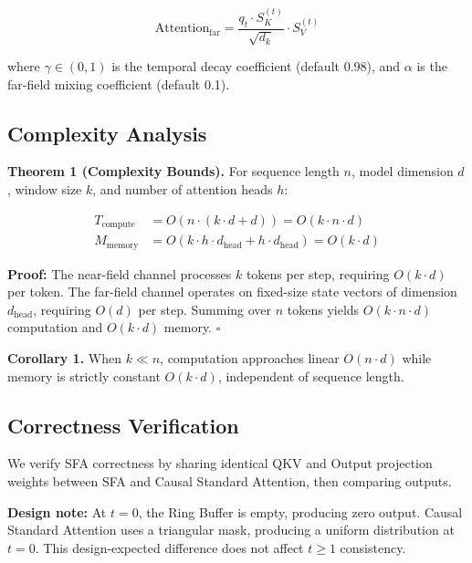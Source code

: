 \documentclass[11pt]{article}
\begin{document}
\begin{equation}
\text{Attention}_{\text{far}} = \frac{q_t \cdot S_K^{(t)}}{\sqrt{d_k}} \cdot S_V^{(t)}
\end{equation}

where $\gamma \in (0,1)$ is the temporal decay coefficient (default 0.98), and $\alpha$ is the far-field mixing coefficient (default 0.1).

\subsection{Complexity Analysis}

\textbf{Theorem 1 (Complexity Bounds).} For sequence length $n$, model dimension $d$, window size $k$, and number of attention heads $h$:

\begin{align}
T_{\text{compute}} &= O(n \cdot (k \cdot d + d)) = O(k \cdot n \cdot d) \\
M_{\text{memory}} &= O(k \cdot h \cdot d_{\text{head}} + h \cdot d_{\text{head}}) = O(k \cdot d)
\end{align}

\noindent\textbf{Proof:} The near-field channel processes $k$ tokens per step, requiring $O(k \cdot d)$ per token. The far-field channel operates on fixed-size state vectors of dimension $d_{\text{head}}$, requiring $O(d)$ per step. Summing over $n$ tokens yields $O(k \cdot n \cdot d)$ computation and $O(k \cdot d)$ memory. $\square$

\textbf{Corollary 1.} When $k \ll n$, computation approaches linear $O(n \cdot d)$ while memory is strictly constant $O(k \cdot d)$, independent of sequence length.

\subsection{Correctness Verification}

We verify SFA correctness by sharing identical QKV and Output projection weights between SFA and Causal Standard Attention, then comparing outputs.

\textbf{Design note:} At $t=0$, the Ring Buffer is empty, producing zero output. Causal Standard Attention uses a triangular mask, producing a uniform distribution at $t=0$. This design-expected difference does not affect $t \geq 1$ consistency.
\end{document}
